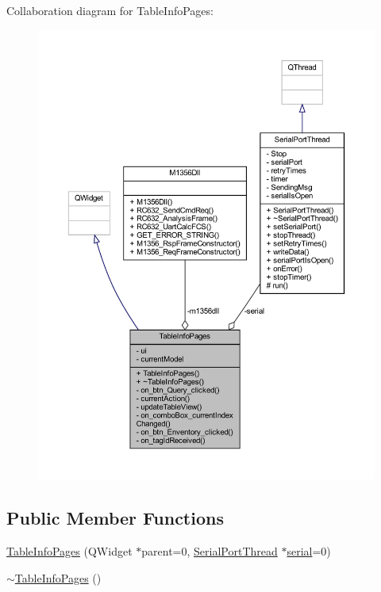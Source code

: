 Collaboration diagram for Table\+Info\+Pages\+:
\nopagebreak
\begin{figure}[H]
\begin{center}
\leavevmode
\includegraphics[width=350pt]{class_table_info_pages__coll__graph}
\end{center}
\end{figure}
\subsection*{Public Member Functions}
\begin{DoxyCompactItemize}
\item 
\mbox{\hyperlink{class_table_info_pages_ab9cfb22829b4a4c7f2eb453e04a5547e}{Table\+Info\+Pages}} (Q\+Widget $\ast$parent=0, \mbox{\hyperlink{class_serial_port_thread}{Serial\+Port\+Thread}} $\ast$\mbox{\hyperlink{class_table_info_pages_a82b9f14a806dec6177ae0242326715b6}{serial}}=0)
\item 
\mbox{\hyperlink{class_table_info_pages_a9f496b74ed85bc0ac9a22f1eaa43d66a}{$\sim$\+Table\+Info\+Pages}} ()
\end{DoxyCompactItemize}
